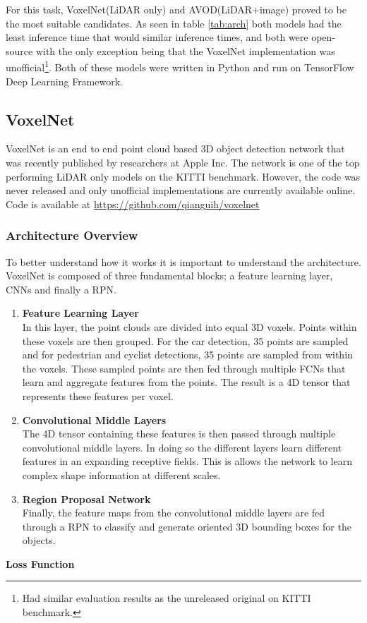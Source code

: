 For this task, VoxelNet(LiDAR only) and AVOD(LiDAR+image) proved to be the most suitable candidates. As seen in table \ref{tab:arch} both models had the least inference time that would similar inference times, and both were open-source with the only exception being that the VoxelNet implementation was unofficial\footnote{Had similar evaluation results as the unreleased original on KITTI benchmark.}. Both of these models were written in Python and run on TensorFlow Deep Learning Framework.

\subsection{VoxelNet}
VoxelNet is an end to end point cloud based 3D object detection network that was recently  published by researchers at Apple Inc. The network is one of the top performing LiDAR only models on the KITTI benchmark. However, the code was never released and only unofficial implementations are currently available online.
Code is available at \url{https://github.com/qianguih/voxelnet}
\subsubsection{Architecture Overview}
To better understand how it works it is important to understand the architecture. VoxelNet is composed of three fundamental blocks; a feature learning layer, CNNs and finally a RPN. 
\begin{enumerate}
	\item \textbf{Feature Learning Layer} \\ 
	In this layer, the point clouds are divided into equal 3D voxels. Points within these voxels are then grouped. For the car detection, 35 points are sampled and for pedestrian and cyclist detections, 35 points are sampled from within the voxels. These sampled points are then fed through multiple FCNs that learn and aggregate features from the points. The result is a 4D tensor that represents these features per voxel.
	
	\item \textbf{Convolutional Middle Layers} \\ 
	The 4D tensor containing these features is then passed through multiple convolutional middle layers. In doing so the different layers learn different features in an expanding receptive fields. This is allows the network to learn complex shape information at different scales. 
	\item \textbf{Region Proposal Network} \\ 
	Finally, the feature maps from the convolutional middle layers are fed through a RPN to classify and generate  oriented 3D bounding boxes for the objects. 
	
\end{enumerate}
\noindent
\textbf{Loss Function} 

